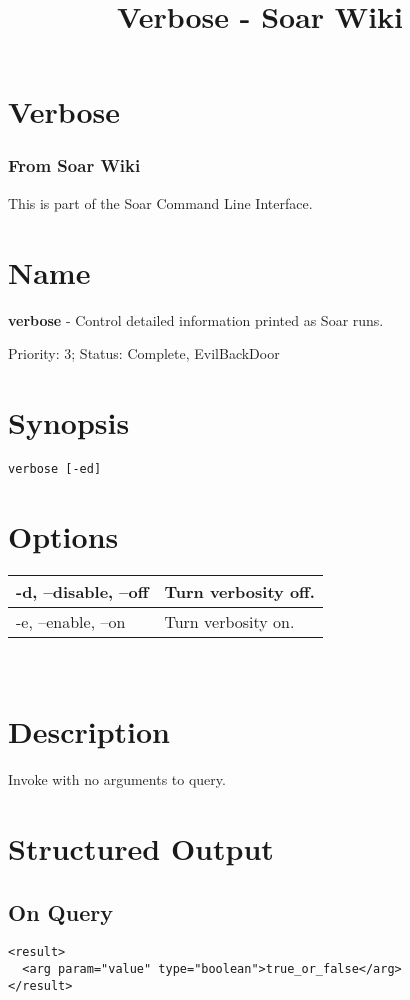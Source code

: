 \documentclass[10pt]{article}
\title{Verbose - Soar Wiki}
\begin{document}
\section*{Verbose}
\subsubsection*{From Soar Wiki}


 This is part of the Soar Command Line Interface. 
\section*{ Name }


 \textbf{verbose}
 - Control detailed information printed as Soar runs. 


 Priority: 3; Status: Complete, EvilBackDoor
\section*{ Synopsis }
\begin{verbatim}
verbose [-ed]

\end{verbatim}
\section*{ Options }


\begin{tabular}{|p{1in}|p{5in}|}
\hline 
 -d, --disable, --off  & Turn verbosity off.  \\
 \hline 
 -e, --enable, --on  & Turn verbosity on.  \\
 \hline 

\end{tabular}



 \\ 

\section*{ Description }


 Invoke with no arguments to query. 
\section*{ Structured Output }
\subsection*{ On Query }
\begin{verbatim}
<result>
  <arg param="value" type="boolean">true_or_false</arg>
</result>

\end{verbatim}
\end{document}
